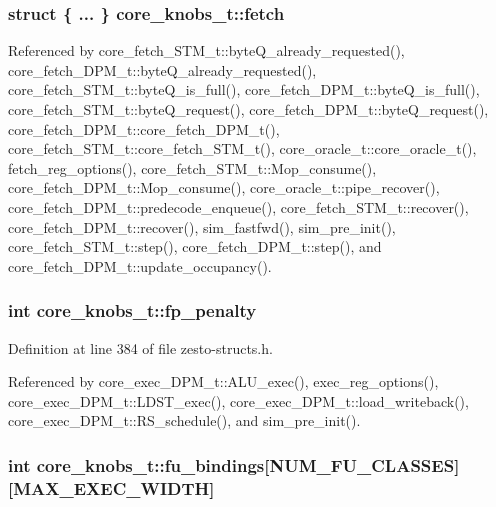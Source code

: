 \subsubsection[{fetch}]{\setlength{\rightskip}{0pt plus 5cm}struct \{ ... \}   {\bf core\_\-knobs\_\-t::fetch}}\label{structcore__knobs__t_7255d0ea236298f95bb8fb003a06c613}




Referenced by core\_\-fetch\_\-STM\_\-t::byteQ\_\-already\_\-requested(), core\_\-fetch\_\-DPM\_\-t::byteQ\_\-already\_\-requested(), core\_\-fetch\_\-STM\_\-t::byteQ\_\-is\_\-full(), core\_\-fetch\_\-DPM\_\-t::byteQ\_\-is\_\-full(), core\_\-fetch\_\-STM\_\-t::byteQ\_\-request(), core\_\-fetch\_\-DPM\_\-t::byteQ\_\-request(), core\_\-fetch\_\-DPM\_\-t::core\_\-fetch\_\-DPM\_\-t(), core\_\-fetch\_\-STM\_\-t::core\_\-fetch\_\-STM\_\-t(), core\_\-oracle\_\-t::core\_\-oracle\_\-t(), fetch\_\-reg\_\-options(), core\_\-fetch\_\-STM\_\-t::Mop\_\-consume(), core\_\-fetch\_\-DPM\_\-t::Mop\_\-consume(), core\_\-oracle\_\-t::pipe\_\-recover(), core\_\-fetch\_\-DPM\_\-t::predecode\_\-enqueue(), core\_\-fetch\_\-STM\_\-t::recover(), core\_\-fetch\_\-DPM\_\-t::recover(), sim\_\-fastfwd(), sim\_\-pre\_\-init(), core\_\-fetch\_\-STM\_\-t::step(), core\_\-fetch\_\-DPM\_\-t::step(), and core\_\-fetch\_\-DPM\_\-t::update\_\-occupancy().
\subsubsection[{fp\_\-penalty}]{\setlength{\rightskip}{0pt plus 5cm}int {\bf core\_\-knobs\_\-t::fp\_\-penalty}}\label{structcore__knobs__t_1e0a19a190d0ecb6eb4fabb1a9b32d2d}




Definition at line 384 of file zesto-structs.h.

Referenced by core\_\-exec\_\-DPM\_\-t::ALU\_\-exec(), exec\_\-reg\_\-options(), core\_\-exec\_\-DPM\_\-t::LDST\_\-exec(), core\_\-exec\_\-DPM\_\-t::load\_\-writeback(), core\_\-exec\_\-DPM\_\-t::RS\_\-schedule(), and sim\_\-pre\_\-init().
\subsubsection[{fu\_\-bindings}]{\setlength{\rightskip}{0pt plus 5cm}int {\bf core\_\-knobs\_\-t::fu\_\-bindings}[NUM\_\-FU\_\-CLASSES][MAX\_\-EXEC\_\-WIDTH]}\label{structcore__knobs__t_2f223e6127eacf183677dab9be649e9b}




